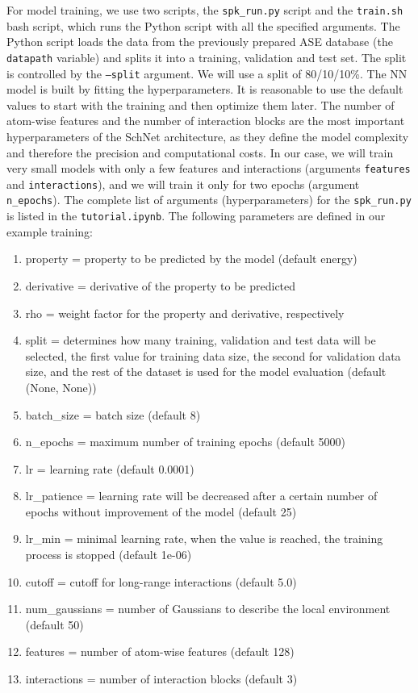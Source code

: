 For model training, we use two scripts, the \texttt{spk\_run.py} script and the \texttt{train.sh} bash script, which runs the Python script with all the specified arguments. The Python script loads the data from the previously prepared ASE database (the \texttt{datapath} variable) and splits it into a training, validation and test set. The split is controlled by the \texttt{--split} argument. We will use a split of 80/10/10\%. The NN model is built by fitting the hyperparameters. It is reasonable to use the default values to start with the training and then optimize them later. The number of atom-wise features and the number of interaction blocks are the most important hyperparameters of the SchNet architecture, as they define the model complexity and therefore the precision and computational costs. In our case, we will train very small models with only a few features and interactions (arguments \texttt{features} and \texttt{interactions}), and we will train it only for two epochs (argument \texttt{n\_epochs}). The complete list of arguments (hyperparameters) for the \texttt{spk\_run.py} is listed in the \texttt{tutorial.ipynb}. The following parameters are defined in our example training:
\begin{enumerate}
    \item[-] property = property to be predicted by the model (default energy)
    \item[-] derivative = derivative of the property to be predicted
    \item[-] rho = weight factor for the property and derivative, respectively
    \item[-] split = determines how many training, validation and test data will be selected, the first value for training data size, the second for validation data size, and the rest of the dataset is used for the model evaluation (default (None, None))
    \item[-] batch\_size = batch size (default 8)
    \item[-] n\_epochs = maximum number of training epochs (default 5000)
    \item[-] lr = learning rate (default 0.0001)
    \item[-] lr\_patience = learning rate will be decreased after a certain number of epochs without improvement of the model (default 25)
    \item[-] lr\_min = minimal learning rate, when the value is reached, the training process is stopped (default 1e-06)
    \item[-] cutoff = cutoff for long-range interactions (default 5.0)
    \item[-] num\_gaussians = number of Gaussians to describe the local environment (default 50)
    \item[-] features = number of atom-wise features (default 128)
    \item[-] interactions = number of interaction blocks (default 3)
\end{enumerate}


